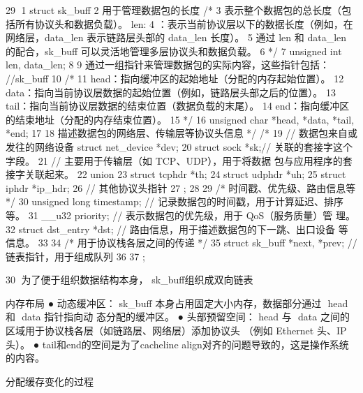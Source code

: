                                                            29
1    struct sk_buff {
2         用于管理数据包的长度
         /*
3          表示整个数据包的总长度（包括所有协议头和数据负载）。
         len:
4             ：表示当前协议层以下的数据长度（例如，在网络层，data_len 表示链路层头部的
         data_len
     长度）。
 5     通过 len 和 data_len 的配合，sk_buff 可以灵活地管理多层协议头和数据负载。
 6        */
 7        unsigned int len, data_len;
 8
 9                通过一组指针来管理数据包的实际内容，这些指针包括：
          //sk_buff
10        /*
11        head：指向缓冲区的起始地址（分配的内存起始位置）。
12        data：指向当前协议层数据的起始位置（例如，链路层头部之后的位置）。
13        tail：指向当前协议层数据的结束位置（数据负载的末尾）。
14        end：指向缓冲区的结束地址（分配的内存结束位置）。
15        */
16        unsigned char *head, *data, *tail, *end;
17
18       描述数据包的网络层、传输层等协议头信息 */
          /*
19                        // 数据包来自或发往的网络设备
          struct net_device *dev;
20        struct sock *sk;// 关联的套接字这个字段。
21                        // 主要用于传输层（如 TCP、UDP），用于将数据
     包与应用程序的套接字关联起来。
22        union {
23            struct tcphdr *th;
24            struct udphdr *uh;
25            struct iphdr *ip_hdr;
26            // 其他协议头指针
27        };
28
29        /* 时间戳、优先级、路由信息等         */
30        unsigned long timestamp;       // 记录数据包的时间戳，用于计算延迟、排序等。
31        __u32 priority;                // 表示数据包的优先级，用于 QoS（服务质量）管
     理。
32      struct dst_entry *dst;           // 路由信息，用于描述数据包的下一跳、出口设备
     等信息。
33
34      /* 用于协议栈各层之间的传递 */
35        struct sk_buff *next, *prev;   //   链表指针，用于组成队列
36
37   };




                                                                  30
为了便于组织数据结构本身， sk_buff组织成双向链表




内存布局
 ● 动态缓冲区： sk_buff﻿ 本身占用固定大小内存，数据部分通过 ﻿      head﻿ 和 ﻿
                                                    data﻿ 指针指向动
   态分配的缓冲区。
 ● 头部预留空间： head﻿ 与 ﻿   data﻿ 之间的区域用于协议栈各层（如链路层、网络层）添加协议头
   （例如 Ethernet 头、IP 头）。
 ● tail和end的空间是为了cacheline align对齐的问题导致的，这是操作系统的内容。

分配缓存变化的过程




